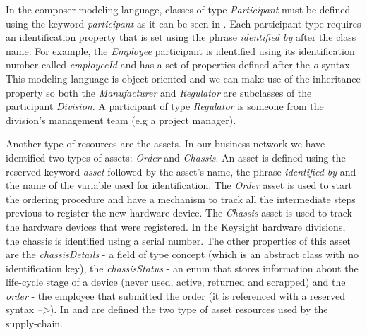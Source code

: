In the composer modeling language, classes of type \emph{Participant} must be defined using the keyword \emph{participant} as it can be seen in . Each participant type requires an identification property that is set using the phrase \emph{identified by} after the class name. For example, the \emph{Employee} participant is identified using its identification number called \emph{employeeId} and has a set of properties defined after the \emph{o } syntax. This modeling language is object-oriented and we can make use of the inheritance property so both the \emph{Manufacturer} and \emph{Regulator} are subclasses of the participant \emph{Division}. A participant of type \emph{Regulator} is someone from the division's management team (e.g a project manager).


Another type of resources are the assets. In our business network we have identified two types of assets: \emph{Order} and \emph{Chassis}. 
An asset is defined using the reserved keyword \emph{asset} followed by the asset's name, the phrase \emph{identified by} and the name of the variable used for identification.
The \emph{Order} asset is used
to start the ordering procedure and have a mechanism to track all the intermediate steps previous to register the new hardware device. 
The \emph{Chassis} asset is used to track the hardware devices that were registered. In the Keysight hardware divisions, the chassis is identified using a serial number. The other properties of this asset are the \emph{chassisDetails} - a field of type concept (which is an abstract class with no identification key), the \emph{chassisStatus} - an enum that stores information about the life-cycle stage of a device (never used, active, returned and scrapped) and the \emph{order} - the employee that submitted the order (it is referenced with a reserved syntax \emph{-->}).
In  and  are defined the two type of asset resources used by the supply-chain. 



